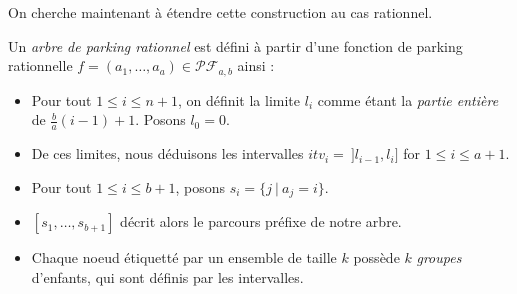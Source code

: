 On cherche maintenant à étendre cette construction au cas rationnel.


\begin{definition}
    Un \emph{arbre de parking rationnel} est défini à partir d'une fonction
    de parking rationnelle $f = (a_1, \ldots, a_a) \in \mathcal{PF}_{a,b}$
    ainsi :
    \begin{itemize}
        \item Pour tout $1 \leqslant i \leqslant n+1$, on définit la limite
            $l_i$ comme étant la \emph{partie entière} de
            $\displaystyle \frac{b}{a}(i-1) + 1$.
            \subitem Posons $l_0 = 0$.
        \item De ces limites, nous déduisons les intervalles
            $itv_i =\ ]l_{i-1}, l_i]$ for $1 \leqslant i
            \leqslant a+1$.
        \item Pour tout $1 \leqslant i \leqslant b + 1$, posons
        $s_i = \{j\ |\ a_j = i\}$.
        \item $[s_1, \ldots, s_{b+1}]$ décrit alors le parcours préfixe
            de notre arbre.
        \item Chaque noeud étiquetté par un ensemble de taille $k$
            possède $k$ \emph{groupes} d'enfants, qui sont définis par
            les intervalles.
    \end{itemize}
\end{definition}

